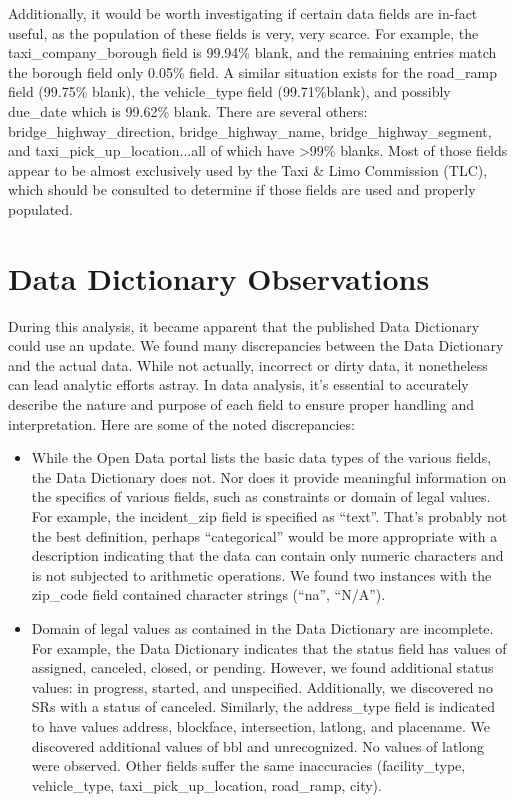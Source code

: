 \documentclass[12pt, titlepage]{article}
\begin{document}
Additionally, it would be worth investigating if certain data fields are 
in-fact useful, as the population of these fields is very, very scarce. For 
example, the taxi\_company\_borough field is 99.94\% blank, and the 
remaining entries match the borough field only 0.05\% field. A similar 
situation exists for the road\_ramp field (99.75\% blank), the 
vehicle\_type field (99.71\%blank), and possibly due\_date which 
is 99.62\% blank. There are several others: bridge\_highway\_direction, 
bridge\_highway\_name, bridge\_highway\_segment, and 
taxi\_pick\_up\_location...all of which have \textgreater99\% 
blanks. Most of those fields appear to be almost exclusively used by 
the Taxi \& Limo Commission (TLC), which should be consulted 
to determine if those fields are used and properly populated.   



\section{Data Dictionary Observations} 
\label{sec:datadictionay}
During this analysis, it became apparent that the published Data 
Dictionary could use an update. We found many discrepancies 
between the Data Dictionary and the actual data. While not actually, 
incorrect or dirty data, it nonetheless can lead analytic efforts astray. In 
data analysis, it's essential to accurately describe the nature and purpose 
of each field to ensure proper handling and interpretation. Here 
are some of the noted discrepancies:  

\begin{itemize}
	\item While the Open Data portal lists the basic data types of the 
	various fields, the Data Dictionary does not. Nor does it provide 
	meaningful information on the specifics of various fields, such 
	as constraints or domain of legal values. For example, the 
	incident\_zip field is specified as ``text''. That's probably not the 
	best definition, perhaps	``categorical'' would be more 
	appropriate with a description indicating that the data can 
	contain only numeric characters and is not subjected to arithmetic 
	operations. We found two instances with the zip\_code field 
	contained character strings (``na'', ``N/A''). 

	\item Domain of legal values as contained in the Data Dictionary 
	are incomplete. For example, the Data Dictionary indicates that 
	the status field has values of assigned, canceled, closed, or pending. 
	However, we found additional status values: in progress, started, 
	and unspecified. Additionally, we discovered no SRs with a status of 
	canceled. Similarly, the address\_type field is indicated to have 
	values address, blockface, intersection, latlong, and placename. We 
	discovered additional values of bbl and unrecognized. No values of 
	latlong were observed. Other fields suffer the same 	inaccuracies 
	(facility\_type, vehicle\_type, taxi\_pick\_up\_location, road\_ramp, city).
\end{itemize}
\end{document}
